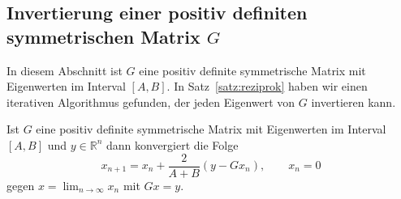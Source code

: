 %
%
\subsection{Invertierung einer positiv definiten symmetrischen Matrix $G$
\label{subsection:ginv}}
In diesem Abschnitt ist $G$ eine positiv definite symmetrische Matrix 
mit Eigenwerten im Interval $[A,B]$.
In Satz~\ref{satz:reziprok} haben wir einen iterativen Algorithmus
gefunden, der jeden Eigenwert von $G$ invertieren kann.


\begin{satz}
\label{satz:ginv}
Ist $G$ eine positiv definite symmetrische Matrix mit Eigenwerten im
Interval $[A,B]$ und $y\in\mathbb R^n$ dann konvergiert die Folge
\[
x_{n+1} = x_n + \frac{2}{A+B} (y - Gx_n),\qquad x_n = 0
\]
gegen 
$
x=\lim_{n\to\infty} x_n
$
mit $Gx=y$.
\end{satz}


